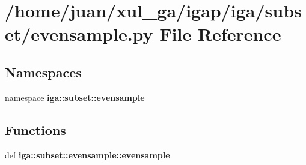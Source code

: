 \section{/home/juan/xul\_\-ga/igap/iga/subset/evensample.py File Reference}
\label{evensample_8py}
\subsection*{Namespaces}
\begin{CompactItemize}
\item 
namespace {\bf iga::subset::evensample}
\end{CompactItemize}
\subsection*{Functions}
\begin{CompactItemize}
\item 
def {\bf iga::subset::evensample::evensample}
\end{CompactItemize}
